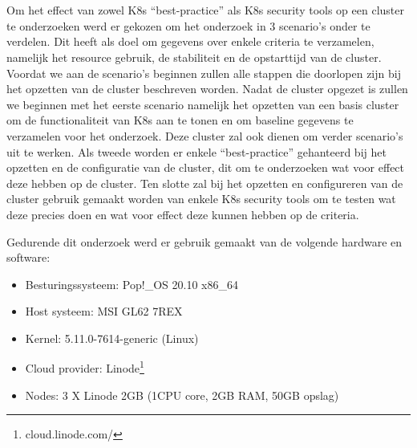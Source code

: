 
\chapter{}
\label{ch:methodologie}

Om het effect van zowel K8s ``best-practice'' als K8s security tools op een cluster te onderzoeken werd er gekozen om het onderzoek in 3 scenario's onder te verdelen. Dit heeft als doel om gegevens over enkele criteria te verzamelen, namelijk het resource gebruik, de stabiliteit en de opstarttijd van de cluster. Voordat we aan de scenario's beginnen zullen alle stappen die doorlopen zijn bij het opzetten van de cluster beschreven worden. Nadat de cluster opgezet is zullen we beginnen met het eerste scenario namelijk het opzetten van een basis cluster om de functionaliteit van K8s aan te tonen en om baseline gegevens te verzamelen voor het onderzoek. Deze cluster zal ook dienen om verder scenario's uit te werken. Als tweede worden er enkele ``best-practice'' gehanteerd bij het opzetten en de configuratie van de cluster, dit om te onderzoeken wat voor effect deze hebben op de cluster. Ten slotte zal bij het opzetten en configureren van de cluster gebruik gemaakt worden van enkele K8s security tools om te testen wat deze precies doen en wat voor effect deze kunnen hebben op de criteria. 

Gedurende dit onderzoek werd er gebruik gemaakt van de volgende hardware en software:

\begin{itemize}
	\item Besturingssysteem: Pop!\_OS 20.10 x86\_64
	\item Host systeem: MSI GL62 7REX
	\item Kernel: 5.11.0-7614-generic (Linux)
	\item Cloud provider: Linode\footnote{cloud.linode.com/}
	\item Nodes: 3 X Linode 2GB (1CPU core, 2GB RAM, 50GB opslag)
\end{itemize}

